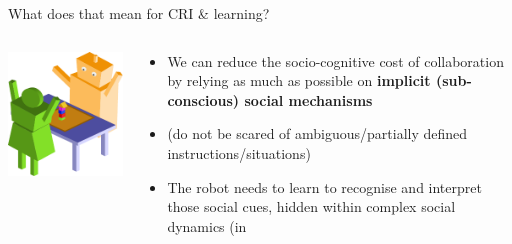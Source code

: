 \documentclass[xcolor=table]{beamer}
\begin{document}

\begin{frame}{What does that mean for CRI \& learning?}

    \begin{columns}
        \begin{column}{0.4\linewidth}
            
            \begin{center}
                \includegraphics[width=0.9\linewidth]{joint-action-scenario-completed}
            \end{center}
        \end{column}
        \begin{column}{0.6\linewidth}
             {
            \begin{itemize}
                \item<+-> We can reduce the socio-cognitive cost of
                    collaboration by relying as much
                    as possible on {\bf implicit (sub-conscious) social mechanisms}
                \item<+-> (do not be scared of ambiguous/partially defined
                    instructions/situations)
                \item<+-> The robot needs to learn to recognise and interpret
                    those social cues, hidden within complex social dynamics (in

\end{itemize}}
\end{column}
\end{columns}
\end{frame}
\end{document}
